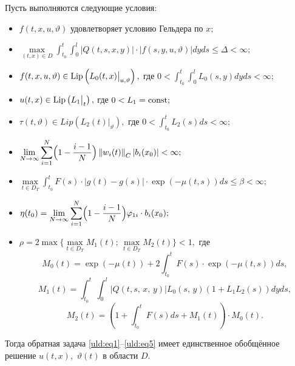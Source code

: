 \begin{theorem}[1]Пусть выполняются следующие условия\/{\rm :}

\begin{itemize}

\item[\rm 1.] $f ( t , x ,  u  ,  \vartheta )$ удовлетворяет условию Гельдера по $x;$

\item[\rm 2.] $\displaystyle \max \limits_{(t , x)\in D }  \int_{t_0}^t \int_0^l  \left| Q (t ,  s , x , y) \right|\cdot
 \left|  f ( s , y ,  u ,  \vartheta ) \right| dy ds \le  \Delta  <\infty;$

\item[\rm 3.] $f( t , x ,  u  ,  \vartheta ) \in \mathop{\rm Lip} \left(L _0 (t,  x) \big|_{u,\vartheta}\right),$
где $0\displaystyle <\int_{t_0}^t \int_0^l L _0 (s , y) dy ds < \infty;$

\item[\rm 4.] $u( t,  x)\in \mathop{\rm Lip} \left( L_1 \big|_t \right),$ где $0<L_1 ={\rm const};$

\item[\rm 5.] $\tau( t, \vartheta)\in Lip \left(L_2 (t) \big|_\vartheta  \right),$ где $\displaystyle 0<\int_{t_0}^t L
_2 (s) d s<\infty ;$

\item[\rm 6.] $\displaystyle \lim \limits_{N\to \infty } \sum\limits_{i =1}^N \Bigl(  1-\frac{i-1}{N}\Bigr)  \left\| w_i(t)\right\|_C \left| b_i  ( x_0) \right| <\infty;$

\item[\rm 7.] $\displaystyle \max \limits_{t\in D_T} \int_{t_0}^t F (s) \cdot \left|  g (t)-g (s) \right|\cdot \exp  \left( - \mu
 (t, s) \right) d s\le \beta <\infty ;$

\item[\rm 8.] $\displaystyle \eta (t_0)=\lim \limits_{N\to \infty } \sum\limits_{i =1}^N \Bigl( 1-\frac{i-1}{N}\Bigr)  \varphi
_{1 i} \cdot b_i  ( x_0);$

\item[\rm 9.] $\rho =2  \max  \bigl\{ \max  \limits_{t\in D_T} M_1 (t);\,\max \limits_{t\in D_T} M_2(t)
\bigr\}<1,$
где 
$$M_0 (t)=\exp  \left(- \mu    (t ) \right)+2 \int_{t_0}^t F (s) \cdot \exp  \left( - \mu    (t , s ) \right) ds,$$
$$M_1 (t)=  \int_{t_0}^t \int_0^l \left| Q(t, s,\,x,\,y) \right| L _0 (s,\,y) \left( 1+L_1 L_2(s)\right)  dy ds,$$ 
$$M_2 (t)=\left( 1+ \int_{t_0}^t F (s) ds + M_1 (t) \right) \cdot M_0 (t).$$


\end{itemize}

Тогда обратная задача \eqref{uld:eq1}--\eqref{uld:eq5} имеет единственное
обобщённое решение $ u (t , x) ,$ $ \vartheta  (t)$ в области $D.$
\end{theorem}
\smallskip

